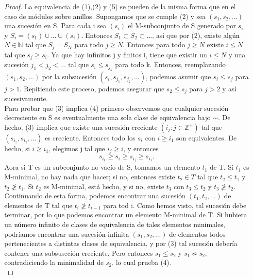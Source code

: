 \documentclass[12pt,spanish]{amsart}
\newcommand{\bb}[1]{\mathbb{#1}}
\theoremstyle{definition}
\theoremstyle{remark}
\begin{document}
\begin{proof}
La equivalencia de (1),(2) y (5) se pueden de la misma forma que en el caso de módulos sobre anillos. Supongamos que se cumple (2) y sea $(s_{1},s_{2},...)$ una sucesión en S. Para cada i sea $(s_{i})$ el M-subconjunto de S generado por $s_{i}$ y $S_{i}=(s_{1})\cup ... \cup (s_{i})$. Entonces $S_{1} \subset S_{2}  \subset ...$, así que por (2), existe algún $N\in \bb{N}$ tal que $S_{j}=S_{N}$ para todo $j\geq N$. Entonces para todo $j \geq N$ existe $i\leq N$ tal que $s_{j}\geq s_{i}$. Ya que hay infinitos j y finitos i, tiene que existir un $i\leq N$ y una sucesión $j_{1} < j_{2} < ...$ tal que $s_{i} \leq s_{j_{k}}$ para todo k. Entonces, reemplazando $(s_{1},s_{2},...)$ por la subsucesión $(s_{i},s_{j_{1}},s_{j_{2}},...)$, podemos asumir que $s_{i}\leq s_{j}$ para $j>1$. Repitiendo este proceso, podemos asegurar que $s_{2} \leq s_{j}$ para $j>2$ y así sucesivamente. \\ 
Para probar que (3) implica (4) primero observemos que cualquier sucesión decreciente en S es eventualmente una sola clase de equivalencia bajo $\sim$. De hecho, (3) implica que existe una sucesión creciente $(i_{j}:j\in \bb{Z}^{+})$ tal que $(s_{i_{1}},s_{i_{2}},...)$ es creciente. Entonces todo los $s_{i}$ con $i\geq i_{1}$ son equivalentes. De hecho, si $i\geq i_{1}$, elegimos j tal que $i_{j}\geq i$, y entonces
$$s_{i_{1}} \geq s_{i} \geq s_{i_{j}} \geq s_{i_{1}}.$$
Aora si T es un subconjunto no vacío de S, tomamos un elemento $t_{1}$ de T. Si $t_{1}$ es M-minimal, no hay nada que hacer; si no, entonces existe $t_{2}\in T$ tal que $t_{2}\leq t_{1}$ y $t_{2} \ngeq t_{1}$. Si $t_{2}$ es M-minimal, está hecho, y si no, existe $t_{3}$ con $t_{3}\leq t_{2}$ y $t_{3} \ngeq t_{2}$. Continuando de esta forma, podemos encontrar una sucesión $(t_{1},t_{2},...)$ de elementos de T tal que $t_{i} \ngeq t_{i-1}$ para tod i. Como hemos visto, tal sucesión debe terminar, por lo que podemos encontrar un elemento M-minimal de T. Si hubiera un número infinito de clases de equivalencia de tales elementos minimales, podríamos encontrar una sucesión infinita $(s_{1},s_{2},...)$ de elementos todos pertenecientes a distintas clases de equivalencia, y por (3) tal sucesión debería contener una subsuseción creciente. Pero entonces $s_{1}\leq s_{2}$ y $s_{1} \nsim s_{2}$, contradiciendo la minimalidad de $s_{2}$, lo cual prueba (4). \\

\end{proof}
\end{document}
